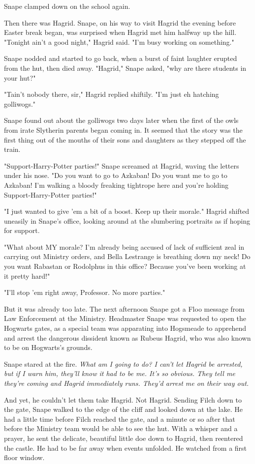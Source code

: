Snape clamped down on the school again.

Then there was Hagrid. Snape, on his way to visit Hagrid the evening before Easter break began, was surprised when Hagrid met him halfway up the hill. "Tonight ain't a good night," Hagrid said. "I'm busy working on something."

Snape nodded and started to go back, when a burst of faint laughter erupted from the hut, then died away. "Hagrid," Snape asked, "why are there students in your hut?"

"Tain't nobody there, sir," Hagrid replied shiftily. "I'm just{\el} eh{\el} hatching golliwogs."

Snape found out about the golliwogs two days later when the first of the owls from irate Slytherin parents began coming in. It seemed that the story was the first thing out of the mouths of their sons and daughters as they stepped off the train.

"Support-Harry-Potter parties!" Snape screamed at Hagrid, waving the letters under his nose. "Do you want to go to Azkaban! Do you want me to go to Azkaban! I'm walking a bloody freaking tightrope here and you're holding Support-Harry-Potter parties!"

"I just wanted to give 'em a bit of a boost. Keep up their morale." Hagrid shifted uneasily in Snape's office, looking around at the slumbering portraits as if hoping for support.

"What about MY morale? I'm already being accused of lack of sufficient zeal in carrying out Ministry orders, and Bella Lestrange is breathing down my neck! Do you want Rabastan or Rodolphus in this office? Because you've been working at it pretty hard!"

"I'll stop 'em right away, Professor. No more parties."

But it was already too late. The next afternoon Snape got a Floo message from Law Enforcement at the Ministry. Headmaster Snape was requested to open the Hogwarts gates, as a special team was apparating into Hogsmeade to apprehend and arrest the dangerous dissident known as Rubeus Hagrid, who was also known to be on Hogwarts's grounds.

Snape stared at the fire. \emph{What am I going to do? I can't let Hagrid be arrested, but if I warn him, they'll know it had to be me. It's so obvious. They tell me they're coming and Hagrid immediately runs. They'd arrest me on their way out.}

And yet, he couldn't let them take Hagrid. Not Hagrid. Sending Filch down to the gate, Snape walked to the edge of the cliff and looked down at the lake. He had a little time before Filch reached the gate, and a minute or so after that before the Ministry team would be able to see the hut. With a whisper and a prayer, he sent the delicate, beautiful little doe down to Hagrid, then reentered the castle. He had to be far away when events unfolded. He watched from a first floor window.

